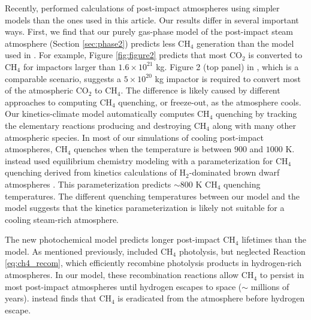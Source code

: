 Recently, \citet{Zahnle_2020} performed calculations of post-impact atmospheres using simpler models than the ones used in this article. Our results differ in several important ways. First, we find that our purely gas-phase model of the post-impact steam atmosphere (Section \ref{sec:phase2}) predicts less CH$_4$ generation than the model used in \citet{Zahnle_2020}. For example, Figure \ref{fig:figure2} predicts that most CO$_2$ is converted to CH$_4$ for impactors larger than $1.6 \times 10^{21}$ kg. Figure 2 (top panel) in \citet{Zahnle_2020}, which is a comparable scenario, suggests a $5 \times 10^{20}$ kg impactor is required to convert most of the atmospheric CO$_2$ to CH$_4$. The difference is likely caused by different approaches to computing CH$_4$ quenching, or freeze-out, as the atmosphere cools. Our kinetics-climate model automatically computes CH$_4$ quenching by tracking the elementary reactions producing and destroying CH$_4$ along with many other atmospheric species. In most of our simulations of cooling post-impact atmospheres, CH$_4$ quenches when the temperature is between $900$ and $1000$ K. \citet{Zahnle_2020} instead used equilibrium chemistry modeling with a parameterization for CH$_4$ quenching derived from kinetics calculations of H$_2$-dominated brown dwarf atmospheres \citep{Zahnle_2014}. This parameterization predicts $\sim 800$ K CH$_4$ quenching temperatures. The different quenching temperatures between our model and the \citet{Zahnle_2020} model suggests that the \citet{Zahnle_2020} kinetics parameterization is likely not suitable for a cooling steam-rich atmosphere.

The new photochemical model predicts longer post-impact CH$_4$ lifetimes than the \citet{Zahnle_2020} model. As mentioned previously, \citet{Zahnle_2020} included CH$_4$ photolysis, but neglected Reaction \ref{eq:ch4_recom}, which efficiently recombine photolysis products in hydrogen-rich atmospheres. In our model, these recombination reactions allow CH$_4$ to persist in most post-impact atmospheres until hydrogen escapes to space ($\sim $ millions of years). \citet{Zahnle_2020} instead finds that CH$_4$ is eradicated from the atmosphere before hydrogen escape. 

